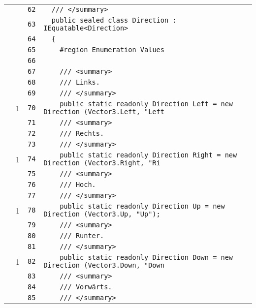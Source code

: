 \documentclass[a4paper,10pt]{article}
\begin{document}
\begin{longtable}[l]{lrrl}
\cellcolor{gray} &  & \verb~62~ & \verb~  /// </summary>~\\
\cellcolor{gray} &  & \verb~63~ & \verb~  public sealed class Direction : IEquatable<Direction>~\\
\cellcolor{gray} &  & \verb~64~ & \verb~  {~\\
\cellcolor{gray} &  & \verb~65~ & \verb~    #region Enumeration Values~\\
\cellcolor{gray} &  & \verb~66~ & \verb~~\\
\cellcolor{gray} &  & \verb~67~ & \verb~    /// <summary>~\\
\cellcolor{gray} &  & \verb~68~ & \verb~    /// Links.~\\
\cellcolor{gray} &  & \verb~69~ & \verb~    /// </summary>~\\
\cellcolor{green} & 1 & \verb~70~ & \verb~    public static readonly Direction Left = new Direction (Vector3.Left, "Left~\\
\cellcolor{gray} &  & \verb~71~ & \verb~    /// <summary>~\\
\cellcolor{gray} &  & \verb~72~ & \verb~    /// Rechts.~\\
\cellcolor{gray} &  & \verb~73~ & \verb~    /// </summary>~\\
\cellcolor{green} & 1 & \verb~74~ & \verb~    public static readonly Direction Right = new Direction (Vector3.Right, "Ri~\\
\cellcolor{gray} &  & \verb~75~ & \verb~    /// <summary>~\\
\cellcolor{gray} &  & \verb~76~ & \verb~    /// Hoch.~\\
\cellcolor{gray} &  & \verb~77~ & \verb~    /// </summary>~\\
\cellcolor{green} & 1 & \verb~78~ & \verb~    public static readonly Direction Up = new Direction (Vector3.Up, "Up");~\\
\cellcolor{gray} &  & \verb~79~ & \verb~    /// <summary>~\\
\cellcolor{gray} &  & \verb~80~ & \verb~    /// Runter.~\\
\cellcolor{gray} &  & \verb~81~ & \verb~    /// </summary>~\\
\cellcolor{green} & 1 & \verb~82~ & \verb~    public static readonly Direction Down = new Direction (Vector3.Down, "Down~\\
\cellcolor{gray} &  & \verb~83~ & \verb~    /// <summary>~\\
\cellcolor{gray} &  & \verb~84~ & \verb~    /// Vorwärts.~\\
\cellcolor{gray} &  & \verb~85~ & \verb~    /// </summary>~\\

\end{longtable}
\end{document}
